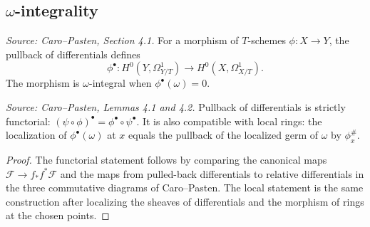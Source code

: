 \subsection{\texorpdfstring{\(\omega\)}{omega}-integrality}

\begin{definition}
  \label{def:cp_omega_integral}
  \textit{Source: Caro--Pasten, Section 4.1.}
  For a morphism of \(T\)-schemes \(\phi:X\to Y\), the pullback of
  differentials defines
  \[
    \phi^\bullet:H^0(Y,\Omega^1_{Y/T})\to H^0(X,\Omega^1_{X/T}).
  \]
  The morphism is \(\omega\)-integral when \(\phi^\bullet(\omega)=0\).
\end{definition}

\begin{lemma}
  \label{lem:cp_omega_integral_functorial_local}
  \textit{Source: Caro--Pasten, Lemmas 4.1 and 4.2.}
  Pullback of differentials is strictly functorial:
  \((\psi\circ\phi)^\bullet=\phi^\bullet\circ\psi^\bullet\).  It is also
  compatible with local rings: the localization of \(\phi^\bullet(\omega)\) at
  \(x\) equals the pullback of the localized germ of \(\omega\) by
  \(\phi_x^\#\).
\end{lemma}
\begin{proof}
  The functorial statement follows by comparing the canonical maps
  \(\mathcal F\to f_*f^*\mathcal F\) and the maps from pulled-back
  differentials to relative differentials in the three commutative diagrams of
  Caro--Pasten.  The local statement is the same construction after localizing
  the sheaves of differentials and the morphism of rings at the chosen points.
\end{proof}

